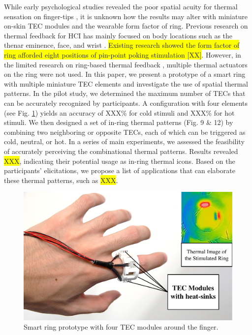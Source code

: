 \documentclass[preprint,12pt]{elsarticle}
\begin{document}
While early psychological studies revealed the poor spatial acuity for thermal sensation on finger-tips \cite{43}, it is unknown how the results may alter with miniature on-skin TEC modules and the wearable form factor of ring. Previous research on thermal feedback for HCI has mainly focused on body locations such as the thenar eminence, face, and wrist \cite{7,9,10,19,20,23,39}. \colorbox{yellow}{Existing research showed the form factor of ring afforded eight positions of pin-point poking stimulation [XX]}. However, in the limited research on ring-based thermal feedback \cite{24},  multiple thermal actuators on the ring were not used. In this paper, we present a prototype of a smart ring with multiple miniature TEC elements and investigate the use of spatial thermal patterns. In the pilot study, we determined the maximum number of TECs that can be accurately recognized by participants. A configuration with four elements (see Fig. \ref{fig:1}) yields an accuracy of XXX\% for cold stimuli and XXX\% for hot stimuli. We then designed a set of in-ring thermal patterns (Fig. 9 \& 12) by combining two neighboring or opposite TECs, each of which can be triggered as cold, neutral, or hot. In a series of main experiments, we assessed the feasibility of accurately perceiving the combinational thermal patterns. Results revealed \colorbox{yellow}{XXX}, indicating their potential usage as in-ring thermal icons. Based on the participants' elicitations, we propose a list of applications that can elaborate these thermal patterns, such as \colorbox{yellow}{XXX}.


\begin{figure}[tp]
  \centering
  \includegraphics[width=0.8\columnwidth]{img/fig1.pdf}
  \caption{Smart ring prototype with four TEC modules around the finger.}
  \label{fig:1}
\end{figure}
\end{document}
